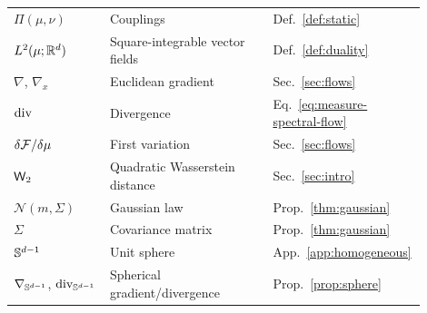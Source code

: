 \begin{longtable}{@{}p{0.23\linewidth}p{0.39\linewidth}p{0.28\linewidth}@{}}
$\Pi(\mu,\nu)$ & Couplings & Def.~\ref{def:static} \\
$L^2(\mu;\mathbb{R}^d)$ & Square-integrable vector fields & Def.~\ref{def:duality} \\
$\nabla$, $\nabla_x$ & Euclidean gradient & Sec.~\ref{sec:flows} \\
$\operatorname{div}$ & Divergence & Eq.~\eqref{eq:measure-spectral-flow} \\
$\delta\mathcal{F}/\delta\mu$ & First variation & Sec.~\ref{sec:flows} \\
$\mathsf{W}_2$ & Quadratic Wasserstein distance & Sec.~\ref{sec:intro} \\
$\mathcal N(m,\Sigma)$ & Gaussian law & Prop.~\ref{thm:gaussian} \\
$\Sigma$ & Covariance matrix & Prop.~\ref{thm:gaussian} \\
$\mathbb{S}^{d-1}$ & Unit sphere & App.~\ref{app:homogeneous} \\
$\nabla_{\mathbb{S}^{d-1}}$, $\operatorname{div}_{\mathbb{S}^{d-1}}$ & Spherical gradient/divergence & Prop.~\ref{prop:sphere} \\
\end{longtable}

